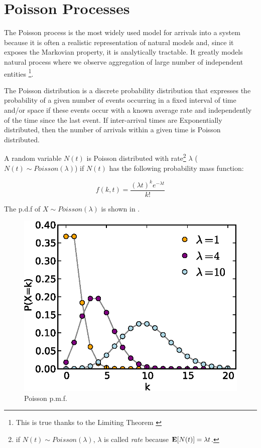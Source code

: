 \section{Poisson Processes}
\label{sec:Poisson-Processes}

The Poisson process is the most widely used model for arrivals into a system because it is often a realistic representation of natural models and, since it exposes the Markovian property, it is analytically tractable.
It greatly models natural process where we observe aggregation of large number of independent entities \footnote{This is true thanks to the Limiting Theorem \cite{ross2014introduction}}.

The Poisson distribution is a discrete probability distribution that expresses the probability of a given number of events occurring in a fixed interval of time and/or space if these events occur with a known average rate and independently of the time since the last event. If inter-arrival times are Exponentially distributed, then the number of arrivals within a given time is Poisson distributed.

\begin{definition}
\label{def:Poisson-Distribution}
	A random variable $N(t)$ is Poisson distributed with rate\footnote{if $N(t) \sim Poisson(\lambda)$, $\lambda$ is called \textit{rate} because $\mathbf{E}[N(t)]=\lambda t$.} $\lambda$ ($N(t) \sim Poisson(\lambda)$) if $N(t)$ has the following probability mass function:
	
	\begin{equation}
	\label{eqn:Poisson-PMF}
	f(k,t) = \frac{(\lambda t)^{k} e^{-\lambda t}}{k!}
	\end{equation}
\end{definition}

The p.d.f of $X \sim Poisson(\lambda)$ is shown in .

\begin{figure}[tp]
\label{fig:Poisson-PMF}	
	\centering
	\includegraphics{fig/poisson-pdf}
	\caption{Poisson p.m.f.}
\end{figure}

